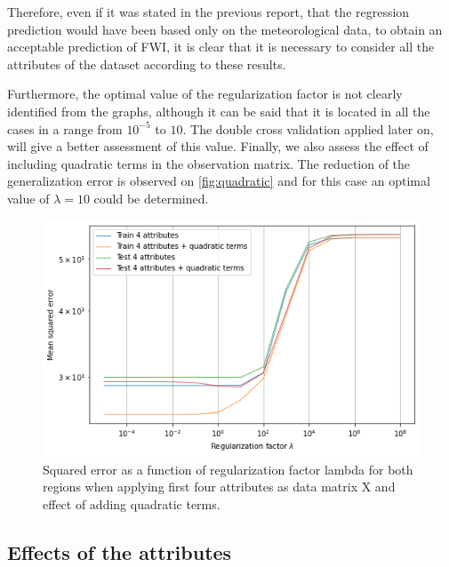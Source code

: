 \documentclass[10pt]{article}
\numberwithin{equation}{section}
\numberwithin{figure}{section}
\numberwithin{table}{section}
\begin{document}
Therefore, even if it was stated in the previous report, that the regression prediction would have been based only on the meteorological data, to obtain an acceptable prediction of FWI, it is clear that it is necessary to consider all the attributes of the dataset according to these results. 

Furthermore, the optimal value of the regularization factor is not clearly identified from the graphs, although it can be said that it is located in all the cases in a range from $10^{-5}$ to $10$. The double cross validation applied later on, will give a better assessment of this value. Finally, we also assess the effect of including quadratic terms in the observation matrix. The reduction of the generalization error is observed on \autoref{fig:quadratic} and for this case an optimal value of $\lambda = 10$ could be determined.

\begin{figure}[H]
    \centering
    \includegraphics[scale=0.5]{Figures/RegularizationFactor_Meteo.png}
    \caption{Squared error as a function of regularization factor lambda for both regions when applying first four attributes as data matrix X and effect of adding quadratic terms.}
    \label{fig:quadratic}
\end{figure}


\subsection{Effects of the attributes}
\end{document}
